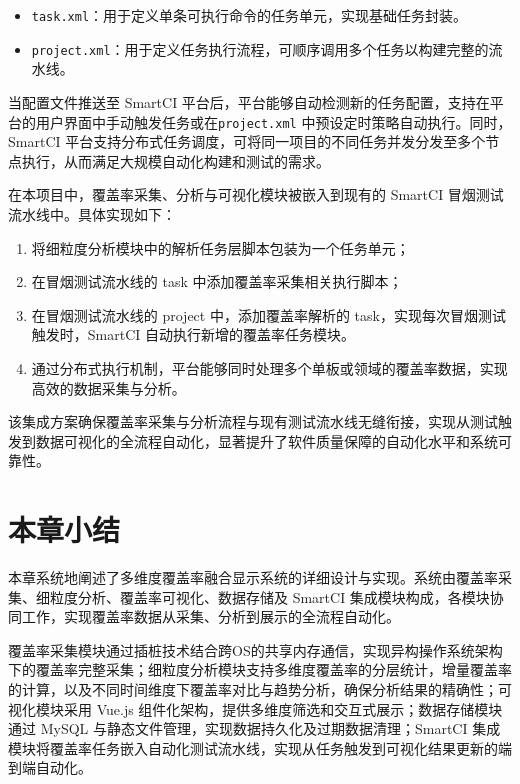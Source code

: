 \begin{itemize}
    \item \verb|task.xml|：用于定义单条可执行命令的任务单元，实现基础任务封装。
    \item \verb|project.xml|：用于定义任务执行流程，可顺序调用多个任务以构建完整的流水线。
\end{itemize}

当配置文件推送至 SmartCI 平台后，平台能够自动检测新的任务配置，支持在平台的用户界面中手动触发任务或在\verb|project.xml| 中预设定时策略自动执行。同时，SmartCI 平台支持分布式任务调度，可将同一项目的不同任务并发分发至多个节点执行，从而满足大规模自动化构建和测试的需求。

在本项目中，覆盖率采集、分析与可视化模块被嵌入到现有的 SmartCI 冒烟测试流水线中。具体实现如下：

\begin{enumerate}
    \item 将细粒度分析模块中的解析任务层脚本包装为一个任务单元；
    \item 在冒烟测试流水线的 task 中添加覆盖率采集相关执行脚本；
    \item 在冒烟测试流水线的 project 中，添加覆盖率解析的 task，实现每次冒烟测试触发时，SmartCI 自动执行新增的覆盖率任务模块。
    \item 通过分布式执行机制，平台能够同时处理多个单板或领域的覆盖率数据，实现高效的数据采集与分析。
\end{enumerate}

该集成方案确保覆盖率采集与分析流程与现有测试流水线无缝衔接，实现从测试触发到数据可视化的全流程自动化，显著提升了软件质量保障的自动化水平和系统可靠性。

\section{本章小结}
本章系统地阐述了多维度覆盖率融合显示系统的详细设计与实现。系统由覆盖率采集、细粒度分析、覆盖率可视化、数据存储及 SmartCI 集成模块构成，各模块协同工作，实现覆盖率数据从采集、分析到展示的全流程自动化。

覆盖率采集模块通过插桩技术结合跨OS的共享内存通信，实现异构操作系统架构下的覆盖率完整采集；细粒度分析模块支持多维度覆盖率的分层统计，增量覆盖率的计算，以及不同时间维度下覆盖率对比与趋势分析，确保分析结果的精确性；可视化模块采用 Vue.js 组件化架构，提供多维度筛选和交互式展示；数据存储模块通过 MySQL 与静态文件管理，实现数据持久化及过期数据清理；SmartCI 集成模块将覆盖率任务嵌入自动化测试流水线，实现从任务触发到可视化结果更新的端到端自动化。
